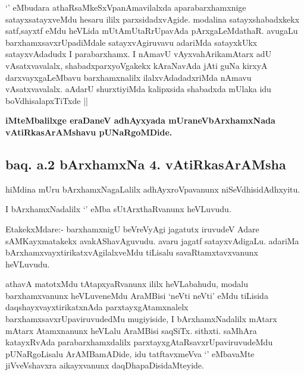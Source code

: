 \begin{artha}

`\stext' eMbudara athaRsaMkeSxVpanAmavilalxda aparabarxhamxnige
  satayxsatayxveMdu hesaru ililx parxsidadxvAgide. modalina
  satayxshabadxkekx satf,sayxtf eMdu heVLida mUtAmUtaRrUpavAda
  pArxgaLeMdathaR. avugaLu barxhamxsavxrUpadiMdale satayxvAgiruvavu
  adariMda satayxkUkx satayxvAdadudx I parabarxhamx. I nAmavU
  vAyxvahArikamAtarx adU vAsatxvavalalx, shabadxparxyoVgakekx
  kAraNavAda jAti guNa kirxyA darxvayxgaLeMbavu barxhamxnalilx
  ilalxvAdadadxriMda nAmavu vAsatxvavalalx. aAdarU shurxtiyiMda
  kalipxsida shabadxda mUlaka idu boVdhisalapxTiTxde || 
\end{artha}

\begin{center}

\textbf{iMteMbalilxge eraDaneV adhAyxyada mUraneVbArxhamxNada vAtiRkasArAMshavu pUNaRgoMDide.}

\end{center}


\begin{center}

\section*{baq. a.2 bArxhamxNa 4. vAtiRkasArAMsha}


\end{center}

\begin{artha}
hiMdina mUru bArxhamxNagaLalilx adhAyxroVpavanunx
niSeVdhisidAdhxyitu.

I bArxhamxNadalilx `\stext' eMba sUtArxthaRvanunx heVLuvudu. 

EtakekxMdare:- barxhamxnigU beVreVyAgi jagatutx iruvudeV Adare
sAMKayxmatakekx avakAShavAguvudu. avaru jagatf satayxvAdigaLu. adariMa
bArxhamxvayxtirikatxvAgilalxveMdu tiLisalu savaRtamxtavxvanunx heVLuvudu.
\end{artha}

\begin{artha}
athavA matotxMdu tAtapxyaRvanunx ililx heVLabahudu, modalu
barxhamxvanunx heVLuveneMdu AraMBisi `neVti neVti' eMdu tiLisida
daqshayxvayxtirikatxnAda parxtayxgAtamxnalelx
barxhamxsavxrUpaviruvudedMu mugiyiside, I bArxhamxNadalilx mAtarx
mAtarx Atamxnanunx heVLalu AraMBisi saqSiTx. sithxti. saMhAra
katayxRvAda parabarxhamxdalilx parxtayxgAtaRsavxrUpaviruvudeMdu
pUNaRgoLisalu ArAMBamADide, idu tatftavxmeVva `\stext' eMbavaMte
jiVveVshavxra aikayxvanunx daqDhapaDisidaMteyide.
\end{artha}


